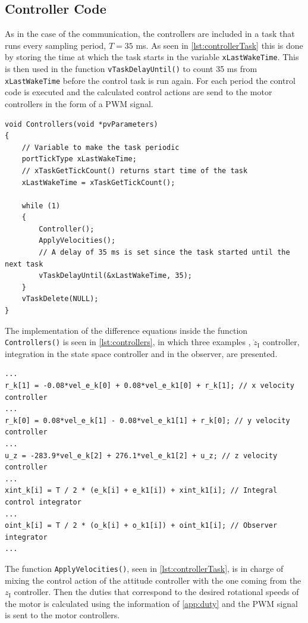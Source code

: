 \subsection{Controller Code}
As in the case of the communication, the controllers are included in a task that runs every sampling period, $T = 35$ \si{ms}. As seen in \autoref{lst:controllerTask} this is done by storing the time at which the task starts in the variable \lstinline[style=customcppinline]{xLastWakeTime}. This is then used in the function \lstinline[style=customcppinline]{vTaskDelayUntil()} to count 35 ms from \lstinline[style=customcppinline]{xLastWakeTime} before the control task is run again. For each period the control code is executed and the calculated control actions are send to the motor controllers in the form of a PWM signal.



\begin{lstlisting}[style=customcpp,
caption={Code for the controller task.}, 
label=lst:controllerTask]
void Controllers(void *pvParameters)
{ 
	// Variable to make the task periodic
	portTickType xLastWakeTime;
	// xTaskGetTickCount() returns start time of the task
	xLastWakeTime = xTaskGetTickCount();
	
	while (1)
	{
		Controller();
		ApplyVelocities();
		// A delay of 35 ms is set since the task started until the next task
		vTaskDelayUntil(&xLastWakeTime, 35);
	}
	vTaskDelete(NULL);
}
\end{lstlisting}

The implementation of the difference equations inside the function \lstinline[style=customcppinline]{Controllers()} is seen in \autoref{lst:controllers}, in which three examples , $\dot{z}_{\mathrm{I}}$ controller, integration in the state space controller and in the observer, are presented.

\begin{lstlisting}[style=customcpp,
caption={Code for the controllers.}, 
label=lst:controllers]
...
r_k[1] = -0.08*vel_e_k[0] + 0.08*vel_e_k1[0] + r_k[1]; // x velocity controller
...
r_k[0] = 0.08*vel_e_k[1] - 0.08*vel_e_k1[1] + r_k[0]; // y velocity controller
...
u_z = -283.9*vel_e_k[2] + 276.1*vel_e_k1[2] + u_z; // z velocity controller
...
xint_k[i] = T / 2 * (e_k[i] + e_k1[i]) + xint_k1[i]; // Integral control integrator
...
oint_k[i] = T / 2 * (o_k[i] + o_k1[i]) + oint_k1[i]; // Observer integrator
...

\end{lstlisting}

The function \lstinline[style=customcppinline]{ApplyVelocities()}, seen in \autoref{lst:controllerTask}, is in charge of mixing the control action of the attitude controller with the one coming from the $z_{\mathrm{I}}$ controller. Then the duties that correspond to the desired rotational speeds of the motor is calculated using the information of \autoref{app:duty} and the PWM signal is sent to the motor controllers.











